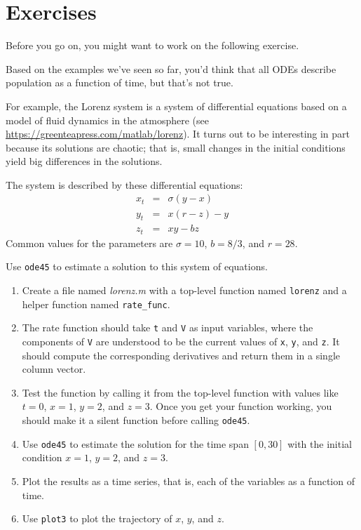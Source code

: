 \section{Exercises}

Before you go on, you might want to work on the following exercise.

\begin{ex}


Based on the examples we've seen so far, you'd think that all ODEs describe population as
a function of time, but that's not true.

For example, the Lorenz system is a system of differential equations based on a model of fluid dynamics in the atmosphere
(see \url{https://greenteapress.com/matlab/lorenz}).
It turns out to be interesting in part because its solutions are chaotic; that is, small changes in the initial conditions yield big differences in the solutions.

The system is described by these differential equations:
%
\begin{eqnarray*}
x_t &=& \sigma (y - x)  \\
y_t &=& x (r - z) - y   \\
z_t &=& xy - b z
\end{eqnarray*}
%
Common values for the parameters are $\sigma = 10$, $b = 8/3$, and $r=28$.

Use \lstinline{ode45} to estimate a solution to this system of equations.

\begin{enumerate}

\item Create a file named \emph{lorenz.m} with a top-level function named \lstinline{lorenz} and a helper function named \lstinline{rate_func}.

\item  The rate function should
take \lstinline{t} and \lstinline{V} as input variables, where the components
of \lstinline{V} are understood to be the current values of \lstinline{x},
\lstinline{y}, and \lstinline{z}.  It should compute the corresponding derivatives
and return them in a single column vector.

\item Test the function by calling it from the top-level function with values like $t=0$, $x=1$, $y=2$, and $z=3$.
Once you get your function working, you should make it a silent function before calling \lstinline{ode45}.

\item Use \lstinline{ode45} to estimate the solution for the time span $[0, 30]$
with the initial condition $x=1$, $y=2$, and $z=3$.

\item Plot the results as a time series, that is, each of the variables as a function of time.

\item Use \lstinline{plot3} to plot the trajectory of $x$, $y$, and $z$.

\end{enumerate}


\end{ex}
